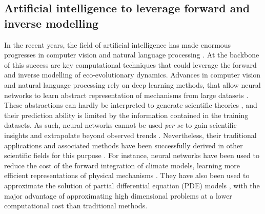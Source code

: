 \subsection{Artificial intelligence to leverage forward and inverse modelling}
\label{subsec:artificial intelligence}
In the recent years, the field of artificial intelligence has made enormous progresses in computer vision \citep{voulodimos2018deep} and natural language processing \citep{young2018recent}. At the backbone of this success are key computational techniques that could leverage the forward and inverse modelling of eco-evolutionary dynamics.
% 
% 
% 
% 
% 
Advances in computer vision and natural language processing rely on deep learning methods, that allow neural networks to learn abstract representation of mechanisms from large datasets \citep{LeCun2015}.
% 
These abstractions can hardly be interpreted to generate scientific theories \citep{Karpatne2017}, and their prediction ability is limited by the information contained in the training datasets. As such, neural networks cannot be used \textit{per se} to gain scientific insights and extrapolate beyond observed trends \citep{Barnosky2012,Urban2016}. %
% 
Nevertheless, their traditional applications and associated methods have been successfully derived in other scientific fields for this purpose \citep{Kashinath2021,Schneider2017,Yazdani2020,Rolnick2023}.
%
For instance, neural networks have been used to reduce the cost of the forward integration of climate models, learning more efficient representations of physical mechanisms \citep{Kashinath2021}.
% 
They have also been used to approximate the solution of partial differential equation (PDE) models \citep{Sirignano2018dgm,Han2018}, with the major advantage of approximating high dimensional problems at a lower computational cost than traditional methods.
